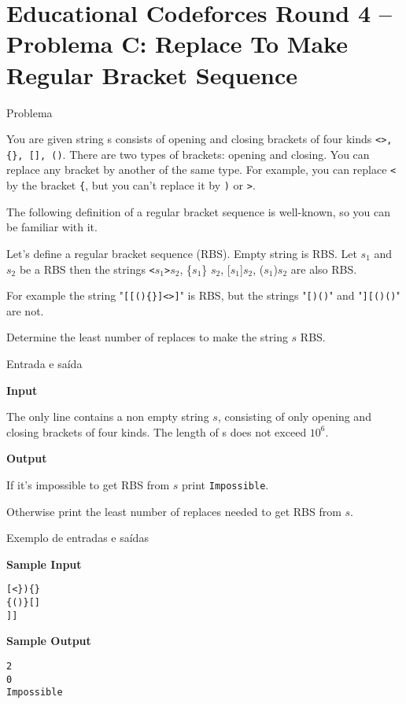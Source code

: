 \section{Educational Codeforces Round 4 -- Problema C: Replace To Make Regular Bracket Sequence}

\begin{frame}[fragile]{Problema}

You are given string s consists of opening and closing brackets of four kinds \texttt{<>, \{\}, [], ()}. There are two types of brackets: opening and closing. You can replace any bracket by another of the same type. For example, you can replace \texttt{<} by the bracket \texttt{\{}, but you can't replace it by \texttt{)} or \texttt{>}.

The following definition of a regular bracket sequence is well-known, so you can be familiar with it.

Let's define a regular bracket sequence (RBS). Empty string is RBS. Let $s_1$ and $s_2$ be a RBS then the strings \texttt{<}$s_1$\texttt{>}$s_2$, \{$s_1$\} $s_2$, [$s_1$]$s_2$, ($s_1$)$s_2$ are also RBS.

For example the string "\texttt{[[()\{\}]<>]}" is RBS, but the strings "\texttt{[)()}" and "\texttt{][()()}" are not.

Determine the least number of replaces to make the string $s$ RBS.

\end{frame}

\begin{frame}[fragile]{Entrada e saída}

\textbf{Input}

The only line contains a non empty string $s$, consisting of only opening and closing brackets of four kinds. The length of s does not exceed $10^6$.

\textbf{Output}

If it's impossible to get RBS from $s$ print \texttt{Impossible}.

Otherwise print the least number of replaces needed to get RBS from $s$.

\end{frame}

\begin{frame}[fragile]{Exemplo de entradas e saídas}

\begin{minipage}[t]{0.5\textwidth}
\textbf{Sample Input}
\begin{verbatim}
[<}){}
{()}[]
]]
\end{verbatim}
\end{minipage}
\begin{minipage}[t]{0.45\textwidth}
\textbf{Sample Output}
\begin{verbatim}
2
0
Impossible
\end{verbatim}
\end{minipage}
\end{frame}

